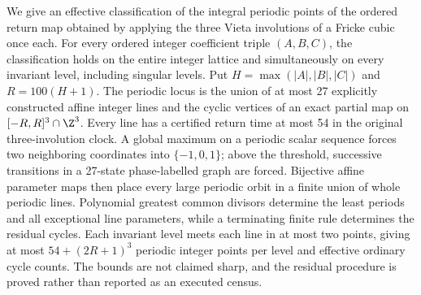 We give an effective classification of the integral periodic points of
the ordered return map obtained by applying the three Vieta involutions
of a Fricke cubic once each. For every ordered integer coefficient triple
\((A,B,C)\), the classification holds on the entire integer lattice and
simultaneously on every invariant level, including singular levels.
Put \(H=\max(|A|,|B|,|C|)\) and \(R=100(H+1)\).
The periodic locus is the union of at most 27 explicitly constructed
affine integer lines and the cyclic vertices of an exact partial map
on \([-R,R]^3\cap\Z^3\). Every line has a certified return time at
most 54 in the original three-involution clock. A global maximum on a
periodic scalar sequence forces two neighboring coordinates into
\(\{-1,0,1\}\); above the threshold, successive transitions in a
27-state phase-labelled graph are forced. Bijective affine parameter
maps then place every large periodic orbit in a finite union of whole
periodic lines. Polynomial greatest common divisors determine the least periods
and all exceptional line parameters, while a terminating finite rule
determines the residual cycles. Each invariant level meets each line
in at most two points, giving at most \(54+(2R+1)^3\) periodic integer
points per level and effective ordinary cycle counts. The bounds are
not claimed sharp, and the residual procedure is proved rather than
reported as an executed census.
